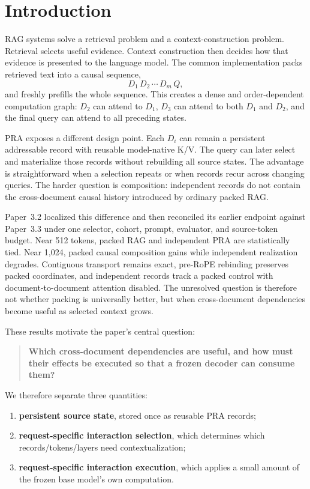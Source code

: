 \documentclass[11pt]{article}
\begin{document}
\section{Introduction}

RAG systems solve a retrieval problem and a context-construction problem.
Retrieval selects useful evidence. Context construction then decides how that
evidence is presented to the language model. The common implementation packs
retrieved text into a causal sequence,
\[
D_1\,D_2\,\cdots\,D_m\,Q,
\]
and freshly prefills the whole sequence. This creates a dense and
order-dependent computation graph: $D_2$ can attend to $D_1$, $D_3$ can attend
to both $D_1$ and $D_2$, and the final query can attend to all preceding
states.

PRA exposes a different design point. Each $D_i$ can remain a persistent
addressable record with reusable model-native K/V. The query can later select
and materialize those records without rebuilding all source states. The
advantage is straightforward when a selection repeats or when records recur
across changing queries. The harder question is composition: independent
records do not contain the cross-document causal history introduced by ordinary
packed RAG.

Paper~3.2 localized this difference and then reconciled its earlier endpoint
against Paper~3.3 under one selector, cohort, prompt, evaluator, and source-token
budget. Near 512 tokens, packed RAG and independent PRA are statistically tied.
Near 1,024, packed causal composition gains while independent realization
degrades. Contiguous transport remains exact, pre-RoPE rebinding preserves
packed coordinates, and independent records track a packed control with
document-to-document attention disabled. The unresolved question is therefore
not whether packing is universally better, but when cross-document dependencies
become useful as selected context grows.

These results motivate the paper's central question:
\begin{quote}
\textbf{Which cross-document dependencies are useful, and how must their effects
be executed so that a frozen decoder can consume them?}
\end{quote}

We therefore separate three quantities:
\begin{enumerate}[leftmargin=*]
    \item \textbf{persistent source state}, stored once as reusable PRA records;
    \item \textbf{request-specific interaction selection}, which determines
    which records/tokens/layers need contextualization;
    \item \textbf{request-specific interaction execution}, which applies a
    small amount of the frozen base model's own computation.
\end{enumerate}
\end{document}
